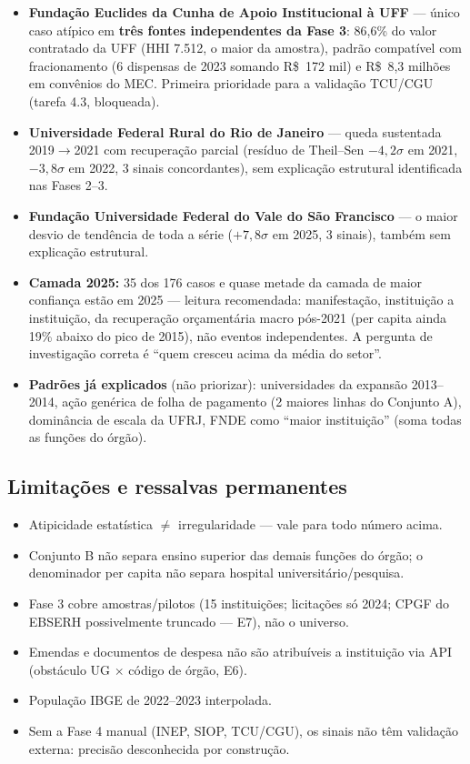 \documentclass[11pt,a4paper]{article}
\begin{document}
\begin{itemize}
    \item \textbf{Fundação Euclides da Cunha de Apoio Institucional à
    UFF} --- único caso atípico em \textbf{três fontes independentes da
    Fase 3}: 86,6\% do valor contratado da UFF (HHI 7.512, o maior da
    amostra), padrão compatível com fracionamento (6 dispensas de 2023
    somando R\$~172 mil) e R\$~8,3 milhões em convênios do MEC. Primeira
    prioridade para a validação TCU/CGU (tarefa 4.3, bloqueada).
    \item \textbf{Universidade Federal Rural do Rio de Janeiro} --- queda
    sustentada 2019$\rightarrow$2021 com recuperação parcial (resíduo de
    Theil--Sen $-4{,}2\sigma$ em 2021, $-3{,}8\sigma$ em 2022, 3 sinais
    concordantes), sem explicação estrutural identificada nas Fases 2--3.
    \item \textbf{Fundação Universidade Federal do Vale do São
    Francisco} --- o maior desvio de tendência de toda a série
    ($+7{,}8\sigma$ em 2025, 3 sinais), também sem explicação estrutural.
    \item \textbf{Camada 2025:} 35 dos 176 casos e quase metade da camada
    de maior confiança estão em 2025 --- leitura recomendada:
    manifestação, instituição a instituição, da recuperação orçamentária
    macro pós-2021 (per capita ainda 19\% abaixo do pico de 2015), não
    eventos independentes. A pergunta de investigação correta é ``quem
    cresceu acima da média do setor''.
    \item \textbf{Padrões já explicados} (não priorizar): universidades
    da expansão 2013--2014, ação genérica de folha de pagamento (2
    maiores linhas do Conjunto A), dominância de escala da UFRJ, FNDE
    como ``maior instituição'' (soma todas as funções do órgão).
\end{itemize}

\subsection*{Limitações e ressalvas permanentes}

\begin{itemize}
    \item Atipicidade estatística $\neq$ irregularidade --- vale para
    todo número acima.
    \item Conjunto B não separa ensino superior das demais funções do
    órgão; o denominador per capita não separa hospital
    universitário/pesquisa.
    \item Fase 3 cobre amostras/pilotos (15 instituições; licitações só
    2024; CPGF do EBSERH possivelmente truncado --- E7), não o universo.
    \item Emendas e documentos de despesa não são atribuíveis a
    instituição via API (obstáculo UG $\times$ código de órgão, E6).
    \item População IBGE de 2022--2023 interpolada.
    \item Sem a Fase 4 manual (INEP, SIOP, TCU/CGU), os sinais não têm
    validação externa: precisão desconhecida por construção.
\end{itemize}
\end{document}
